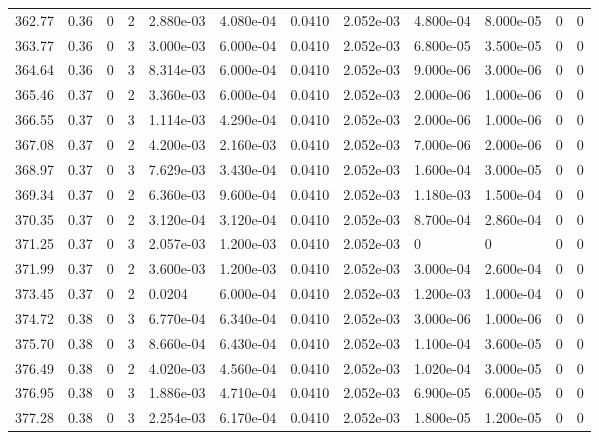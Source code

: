 \documentclass[preview]{standalone}
\begin{document}
{{{{{{{{{{{{{\begin{tabular}{L{1.2cm}C{1.2cm} C{0.3cm}C{0.5cm} C{1.4cm}C{1.4cm} C{1.4cm}C{1.4cm} C{1.6cm}C{1.6cm} C{1.6cm}C{1.6cm}}
  362.77  &  0.36  & 0     &  2 &  2.880e-03  & 4.080e-04  &  0.0410&   2.052e-03& 4.800e-04 & 8.000e-05   &  0 & 0  \\ 
  363.77  &  0.36  & 0     &  3 &  3.000e-03  & 6.000e-04  &  0.0410&   2.052e-03& 6.800e-05 & 3.500e-05   &  0 & 0  \\ 
  364.64  &  0.36  & 0     &  3 &  8.314e-03  & 6.000e-04  &  0.0410&   2.052e-03& 9.000e-06 & 3.000e-06   &  0 & 0  \\ 
  365.46  &  0.37  & 0     &  2 &  3.360e-03  & 6.000e-04  &  0.0410&   2.052e-03& 2.000e-06 & 1.000e-06   &  0 & 0  \\ 
  366.55  &  0.37  & 0     &  3 &  1.114e-03  & 4.290e-04  &  0.0410&   2.052e-03& 2.000e-06 & 1.000e-06   &  0 & 0  \\ 
  367.08  &  0.37  & 0     &  2 &  4.200e-03  & 2.160e-03  &  0.0410&   2.052e-03& 7.000e-06 & 2.000e-06   &  0 & 0  \\ 
  368.97  &  0.37  & 0     &  3 &  7.629e-03  & 3.430e-04  &  0.0410&   2.052e-03& 1.600e-04 & 3.000e-05   &  0 & 0  \\ 
  369.34  &  0.37  & 0     &  2 &  6.360e-03  & 9.600e-04  &  0.0410&   2.052e-03& 1.180e-03 & 1.500e-04   &  0 & 0  \\ 
  370.35  &  0.37  & 0     &  2 &  3.120e-04  & 3.120e-04  &  0.0410&   2.052e-03& 8.700e-04 & 2.860e-04   &  0 & 0  \\ 
  371.25  &  0.37  & 0     &  3 &  2.057e-03  & 1.200e-03  &  0.0410&   2.052e-03& 0 & 0   &  0 & 0  \\ 
  371.99  &  0.37  & 0     &  2 &  3.600e-03  & 1.200e-03  &  0.0410&   2.052e-03& 3.000e-04 & 2.600e-04   &  0 & 0  \\ 
  373.45  &  0.37  & 0     &  2 &  0.0204  & 6.000e-04  &  0.0410&   2.052e-03& 1.200e-03 & 1.000e-04   &  0 & 0  \\ 
  374.72  &  0.38  & 0     &  3 &  6.770e-04  & 6.340e-04  &  0.0410&   2.052e-03& 3.000e-06 & 1.000e-06   &  0 & 0  \\ 
  375.70  &  0.38  & 0     &  3 &  8.660e-04  & 6.430e-04  &  0.0410&   2.052e-03& 1.100e-04 & 3.600e-05   &  0 & 0  \\ 
  376.49  &  0.38  & 0     &  2 &  4.020e-03  & 4.560e-04  &  0.0410&   2.052e-03& 1.020e-04 & 3.000e-05   &  0 & 0  \\ 
  376.95  &  0.38  & 0     &  3 &  1.886e-03  & 4.710e-04  &  0.0410&   2.052e-03& 6.900e-05 & 6.000e-05   &  0 & 0  \\ 
  377.28  &  0.38  & 0     &  3 &  2.254e-03  & 6.170e-04  &  0.0410&   2.052e-03& 1.800e-05 & 1.200e-05   &  0 & 0  \\ 

\end{tabular}}}}}}}}}}}}}}
\end{document}
